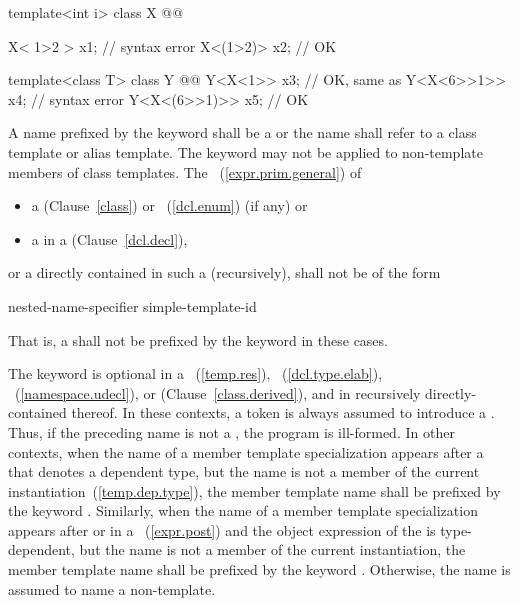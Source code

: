 \begin{codeblock}
template<int i> class X @@

X< 1>2 > x1;                        // syntax error
X<(1>2)> x2;                        // OK

template<class T> class Y @@
Y<X<1>> x3;                         // OK, same as 
Y<X<6>>1>> x4;                      // syntax error
Y<X<(6>>1)>> x5;                    // OK
\end{codeblock}
\exitexample

\pnum
A name prefixed by the keyword
shall be a  or the name shall refer to a class template or alias template.
\enternote
The keyword
may not be applied to non-template members of class templates.
\exitnote
The ~(\ref{expr.prim.general}) of
\begin{itemize}
\item a  (Clause~\ref{class})
or ~(\ref{dcl.enum}) (if any) or
\item a  in a  (Clause~\ref{dcl.decl}),
\end{itemize}
or a  directly contained in
such a  (recursively),
shall not be of the form

\begin{ncsimplebnf}
nested-name-specifier  simple-template-id \terminal{::}
\end{ncsimplebnf}

\enternote
That is, a  shall not be prefixed by
the keyword  in these cases.
\exitnote

\pnum
The keyword  is optional in a
~(\ref{temp.res}),
~(\ref{dcl.type.elab}),
~(\ref{namespace.udecl}), or
 (Clause~\ref{class.derived}), and in
recursively directly-contained  thereof.
In these contexts, a \tcode{<} token is always assumed
to introduce a .
\enternote
Thus, if the preceding name is not a ,
the program is ill-formed.
\exitnote
In other contexts, when the name of a member template
specialization appears after a 
that denotes a dependent type, but the name is not a
member of the current instantiation~(\ref{temp.dep.type}),
the member template name shall be prefixed by
the keyword .
Similarly, when the name of a member template specialization
appears after  or \tcode{->} in a
~(\ref{expr.post}) and
the object expression of the  is
type-dependent,
but the name is not a
member of the current instantiation,
the member template name shall be prefixed
by the keyword .
Otherwise, the name is assumed to name a non-template.

